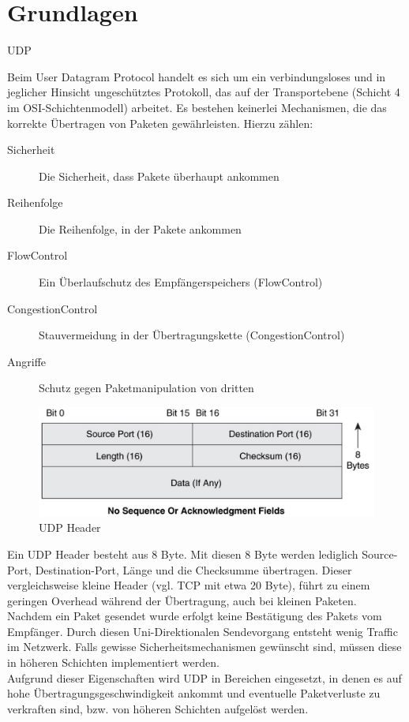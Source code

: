 \chapter{Grundlagen}
\label{ch:Grundlagen}


UDP

Beim User Datagram Protocol handelt es sich um ein verbindungsloses und in jeglicher Hinsicht ungeschütztes Protokoll, das auf der Transportebene (Schicht 4 im OSI-Schichtenmodell) arbeitet. Es bestehen keinerlei Mechanismen, die das korrekte Übertragen von Paketen gewährleisten. Hierzu zählen:

\begin{description}
	\item[Sicherheit] Die Sicherheit, dass Pakete überhaupt ankommen
	\item[Reihenfolge] Die Reihenfolge, in der Pakete ankommen
	\item[FlowControl] Ein Überlaufschutz des Empfängerspeichers (FlowControl)
	\item[CongestionControl] Stauvermeidung in der Übertragungskette (CongestionControl)
	\item[Angriffe] Schutz gegen Paketmanipulation von dritten
\end{description}

\begin{figure}
\includegraphics[width=\textwidth]{images/UDP_header.pdf}
\caption{UDP Header}
\label{fig:udp_header}
\end{figure}

Ein UDP Header besteht aus 8 Byte. Mit diesen 8 Byte werden lediglich Source-Port, Destination-Port, Länge und die Checksumme übertragen. Dieser vergleichsweise kleine Header (vgl. TCP mit etwa 20 Byte), führt zu einem geringen Overhead während der Übertragung, auch bei kleinen Paketen. Nachdem ein Paket gesendet wurde erfolgt keine Bestätigung des Pakets vom Empfänger. Durch diesen Uni-Direktionalen Sendevorgang entsteht wenig Traffic im Netzwerk. Falls gewisse Sicherheitsmechanismen gewünscht sind, müssen diese in höheren Schichten implementiert werden. \\
Aufgrund dieser Eigenschaften wird UDP in Bereichen eingesetzt, in denen es auf hohe Übertragungsgeschwindigkeit ankommt und eventuelle Paketverluste zu verkraften sind, bzw. von höheren Schichten aufgelöst werden.

